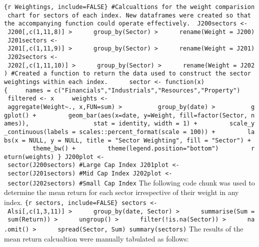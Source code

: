 \documentclass[
]{article}
\begin{document}
\texttt{\{r\ Weightings,\ include=FALSE\}\ \#Calcualtions\ for\ the\ weight\ comparision\ chart\ for\ sectors\ of\ each\ index.\ New\ dataframes\ were\ created\ so\ that\ the\ accompanying\ function\ could\ operate\ effectively.\ \ J200sectors\ \textless{}-\ J200{[},c(1,11,8){]}\ \textbar{}\textgreater{}\ \ \ \ \ \ group\_by(Sector)\ \textbar{}\textgreater{}\ \ \ \ \ \ rename(Weight\ =\ J200)\ J201sectors\ \textless{}-\ J201{[},c(1,11,9){]}\ \textbar{}\textgreater{}\ \ \ \ \ \ group\_by(Sector)\ \textbar{}\textgreater{}\ \ \ \ \ \ rename(Weight\ =\ J201)\ J202sectors\ \textless{}-\ J202{[},c(1,11,10){]}\ \textbar{}\textgreater{}\ \ \ \ \ \ group\_by(Sector)\ \textbar{}\textgreater{}\ \ \ \ \ \ rename(Weight\ =\ J202)\ \#Created\ a\ function\ to\ return\ the\ data\ used\ to\ construct\ the\ sector\ weightings\ within\ each\ index.\ \ \ \ \ \ sector\ \textless{}-\ function(x)\{\ \ \ \ \ names\ =\ c("Financials","Industrials","Resources","Property")\ \ \ \ \ filtered\ \textless{}-\ x\ \ \ \ \ weights\ \textless{}-\ aggregate(Weight\textasciitilde{}.,\ x,FUN=sum)\ \textbar{}\textgreater{}\ \ \ \ \ \ \ \ \ \ group\_by(date)\ \textbar{}\textgreater{}\ \ \ \ \ \ \ \ \ \ ggplot()\ +\ \ \ \ \ \ \ \ \ geom\_bar(aes(x=date,\ y=Weight,\ fill=factor(Sector,\ names)),\ \ \ \ \ \ \ \ \ \ \ \ \ \ \ \ \ \ stat\ =\ \textquotesingle{}identity\textquotesingle{},\ width\ =\ 1)\ +\ \ \ \ \ \ \ \ \ scale\_y\_continuous(labels\ =\ scales::percent\_format(scale\ =\ 100))\ +\ \ \ \ \ \ \ \ \ labs(x\ =\ NULL,\ y\ =\ NULL,\ title\ =\ "Sector\ Weighting",\ fill\ =\ "Sector")\ +\ \ \ \ \ \ \ \ \ theme\_bw()\ +\ \ \ \ \ \ \ \ \ theme(legend.position="bottom")\ \ \ \ \ \ \ \ \ return(weights)\ \}\ J200plot\ \textless{}-\ sector(J200sectors)\ \#Large\ Cap\ Index\ J201plot\ \textless{}-\ sector(J201sectors)\ \#Mid\ Cap\ Index\ J202plot\ \textless{}-\ sector(J202sectors)\ \#Small\ Cap\ Index}
The following code chunk was used to determine the mean return for each
sector irrespective of their weight in any index.
\texttt{\{r\ sectors,\ include=FALSE\}\ sectors\ \textless{}-\ Alsi{[},c(1,3,11){]}\ \textbar{}\textgreater{}\ \ \ \ \ \ group\_by(date,\ Sector)\ \textbar{}\textgreater{}\ \ \ \ \ \ summarise(Sum\ =\ sum(Return))\ \textbar{}\textgreater{}\ \ \ \ \ \ ungroup()\ \textbar{}\textgreater{}\ \ \ \ \ \ filter(!is.na(Sector))\ \textbar{}\textgreater{}\ \ \ \ \ \ na.omit()\ \textbar{}\textgreater{}\ \ \ \ \ \ spread(Sector,\ Sum)\ summary(sectors)}
The results of the mean return calcualtion were manually tabulated as
follows:
\end{document}
